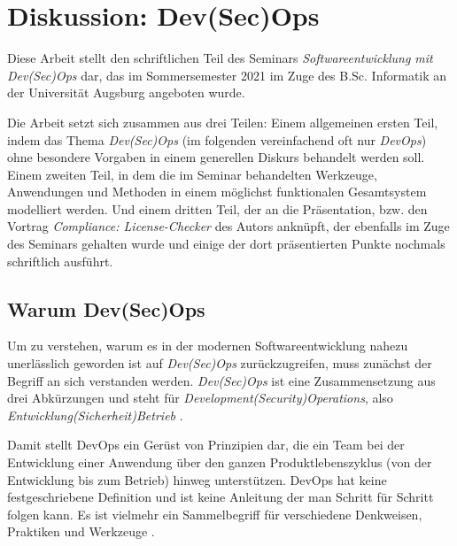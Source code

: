 \chapter{Diskussion: Dev(Sec)Ops}

Diese Arbeit stellt den schriftlichen Teil des Seminars \emph{Softwareentwicklung mit Dev(Sec)Ops} dar, das im Sommersemester 2021 im Zuge des B.Sc. Informatik an der Universität Augsburg angeboten wurde.

Die Arbeit setzt sich zusammen aus drei Teilen: Einem allgemeinen ersten Teil, indem das Thema \emph{Dev(Sec)Ops} (im folgenden vereinfachend oft nur \emph{DevOps}) ohne besondere Vorgaben in einem generellen Diskurs behandelt werden soll. Einem zweiten Teil, in dem die im Seminar behandelten Werkzeuge, Anwendungen und Methoden in einem möglichst funktionalen Gesamtsystem modelliert werden. Und einem dritten Teil, der an die Präsentation, bzw. den Vortrag \emph{Compliance: License-Checker} des Autors anknüpft, der ebenfalls im Zuge des Seminars gehalten wurde und einige der dort präsentierten Punkte nochmals schriftlich ausführt.

\section{Warum Dev(Sec)Ops}

Um zu verstehen, warum es in der modernen Softwareentwicklung nahezu unerlässlich geworden ist auf \emph{Dev(Sec)Ops} zurückzugreifen, muss zunächst der Begriff an sich verstanden werden. \emph{Dev(Sec)Ops} ist eine Zusammensetzung aus drei Abkürzungen und steht für \emph{Development(Security)Operations}, also \emph{Entwicklung(Sicherheit)Betrieb} \cite{forcepointWhatDevSecOpsDefined}. 

Damit stellt DevOps ein Gerüst von Prinzipien dar, die ein Team bei der Entwicklung einer Anwendung über den ganzen Produktlebenszyklus (von der Entwicklung bis zum Betrieb) hinweg unterstützen. DevOps hat keine festgeschriebene Definition und ist keine Anleitung der man Schritt für Schritt folgen kann. Es ist vielmehr ein Sammelbegriff für verschiedene Denkweisen, Praktiken und Werkzeuge \cite{awsWasIstDevOps}.

